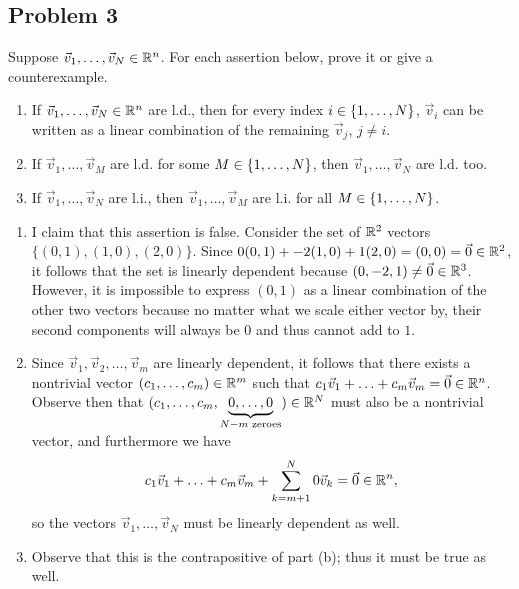 \documentclass[main.tex]{subfiles}
\begin{document}
\subsection{Problem 3}
\begin{claim}
    Suppose $\vec{v}_1, \ldots , \vec{v}_N \in \mathbb R^n$. For each assertion below, prove it or give a counterexample.
    \begin{enumerate}[label=(\alph*)]
        \item If $\vec{v}_1, \ldots , \vec{v}_N \in \mathbb R^n$ are l.d., then for every index $i \in \left\{ 1,\ldots , N \right\}$, $\vec{v}_i$ can be written as a linear combination of the remaining $\vec{v}_j$, $j \neq i$.
        \item If $\vec{v}_1, \ldots , \vec{v}_M$ are l.d. for some $M \in \left\{ 1,\ldots , N \right\}$, then $\vec{v}_1, \ldots , \vec{v}_N$ are l.d. too.
        \item If $\vec{v}_1, \ldots , \vec{v}_N$ are l.i., then $\vec{v}_1, \ldots , \vec{v}_M$ are l.i. for all $M \in \left\{ 1,\ldots , N \right\}$.
    \end{enumerate}
\end{claim}

\begin{soln}
    \begin{enumerate}[label=(\alph*)]
        \item I claim that this assertion is false. Consider the set of $\mathbb R^2$ vectors $\{(0, 1), (1, 0), (2, 0)\}$. Since $0(0, 1) + -2(1, 0) + 1(2, 0) = (0, 0) = \vec{0}\in \mathbb R^2$, it follows that the set is linearly dependent because $(0, -2, 1)\neq \vec{0}\in \mathbb R^3$. However, it is impossible to express $(0, 1)$ as a linear combination of the other two vectors because no matter what we scale either vector by, their second components will always be $0$ and thus cannot add to $1$.
        
        \item Since $\vec{v}_1, \vec{v}_2, \ldots , \vec{v}_m$ are linearly dependent, it follows that there exists a nontrivial vector $(c_1, \ldots , c_m)\in \mathbb R^m$ such that $c_1\vec{v}_1 + \ldots + c_m\vec{v}_m = \vec{0}\in \mathbb R^n$. Observe then that $(c_1, \ldots , c_m, \underbrace{0, \ldots , 0}_{N - m\text{ zeroes}})\in \mathbb R^N$ must also be a nontrivial vector, and furthermore we have
        \[c_1\vec{v}_1 + \ldots + c_m\vec{v}_m + \sum_{k = m + 1}^N 0\vec{v}_k = \vec{0}\in \mathbb R^n,\]
        so the vectors $\vec{v}_1, \ldots , \vec{v}_N$ must be linearly dependent as well.

        \item Observe that this is the contrapositive of part (b); thus it must be true as well.\qedhere
    \end{enumerate}
\end{soln}
\eject
\end{document}
